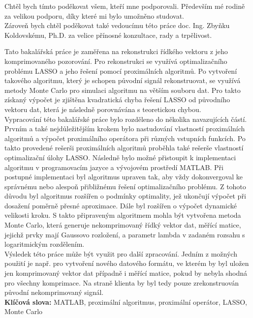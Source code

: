 \documentclass[FM,BP]{tulthesis}
\begin{document}
\begin{acknowledgement}
Chtěl bych tímto poděkovat všem, kteří mne podporovali. Především mé rodině za velikou podporu, díky které mi bylo umožněno studovat. 
\\
Zároveň bych chtěl poděkovat také vedoucímu této práce doc. Ing. Zbyňku Koldovskému, Ph.D. za velice přínosné konzultace, rady a trpělivost.
\end{acknowledgement}
\clearpage
\begin{abstractCZ}

Tato bakalářská práce je zaměřena na rekonstrukci řídkého vektoru z jeho komprimovaného pozorování. Pro rekonstrukci se využívá optimalizačního problému LASSO a jeho řešení pomocí proximálních algoritmů. Po vytvoření takového algoritmu, který je schopen původní signál rekonstruovat, se využívá metody Monte Carlo pro simulaci algoritmu na větším souboru dat. Pro takto získaný výpočet je zjištěna kvadratická chyba řešení LASSO od původního vektoru dat, která je následně porovnávána s teoretickou chybou.  
\\

Vypracování této bakalářské práce bylo rozděleno do několika navazujících částí. Prvním a také nejdůležitějším krokem bylo nastudování vlastností proximálních algoritmů a výpočet proximálního operátora při různých vstupních funkcích. Po takto provedené rešerši proximálních algoritmů proběhla také rešerše vlastností optimalizační úlohy LASSO. Následně bylo možné přistoupit k implementaci algoritmu v programovacím jazyce a vývojovém prostředí MATLAB. Při postupné implementaci byl algoritmus upraven tak, aby vždy dokonvergoval ke správnému nebo alespoň přibližnému řešení optimalizačního problému. Z tohoto důvodu byl algoritmus rozšířen o podmínky optimality, jež ukončují výpočet při dosažení poměrně přesné aproximace. Dále byl rozšířen o výpočet dynamické velikosti kroku. S takto připraveným algoritmem mohla být vytvořena metoda Monte Carlo, která generuje nekomprimovaný řídký vektor dat, měřící matice, jejichž prvky mají Gaussovo rozložení, a parametr lambda v zadaném rozsahu s logaritmickým rozdělením.  
\\

Výsledek této práce může být využit pro další zpracování. Jedním z možných použití je např. pro vytvoření nového datového formátu, ve kterém by byl uložen jen komprimovaný vektor dat případně i měřící matice, pokud by nebyla shodná pro všechny komprimace. Na straně klienta by byl tedy pouze zrekonstruován původní nekomprimovaný signál.
\\

\textbf{Klíčová slova:} MATLAB, proximální algoritmus, proximální operátor, LASSO, Monte Carlo
\end{abstractCZ}
\end{document}
